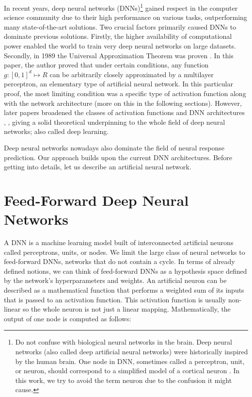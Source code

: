 In recent years, deep neural networks (DNNs)\footnote{Do not confuse with biological neural networks in the brain. Deep neural networks (also called deep artificial neural networks) were historically inspired by the human brain. One node in DNN, sometimes called a perceptron, unit, or neuron, should correspond to a simplified model of a cortical neuron \citep{rosenblatt1958perceptron}. In this work, we try to avoid the term neuron due to the confusion it might cause.} gained respect in the computer science community due to their high performance on various tasks, outperforming many state-of-the-art solutions. Two crucial factors primarily caused DNNs to dominate previous solutions. Firstly, the higher availability of computational power enabled the world to train very deep neural networks on large datasets. Secondly, in 1989 the Universal Approximation Theorem was proven \citep{cybenko1989approximation}. In this paper, the author proved that under certain conditions, any function $g: [0, 1]^d \mapsto R$ can be arbitrarily closely approximated by a multilayer perceptron, an elementary type of artificial neural network. In this particular proof, the most limiting condition was a specific type of activation function along with the network architecture (more on this in the following sections). However, later papers broadened the classes of activation functions and DNN architectures \citep{leshno1993multilayer}, \citep{heinecke2020refinement} \citep{zhou2020universality}, giving a solid theoretical underpinning to the whole field of deep neural networks; also called deep learning.

Deep neural networks nowadays also dominate the field of neural response prediction. Our approach builds upon the current DNN architectures. Before getting into details, let us describe an artificial neural network.

\section{Feed-Forward Deep Neural Networks}

A DNN is a machine learning model built of interconnected artificial neurons called perceptrons, units, or nodes. We limit the large class of neural networks to feed-forward DNNs, networks that do not contain a cycle. In terms of already defined notions, we can think of feed-forward DNNs as a hypothesis space defined by the network’s hyperparameters and weights. An artificial neuron can be described as a mathematical function that performs a weighted sum of its inputs that is passed to an activation function. This activation function is usually non-linear so the whole neuron is not just a linear mapping. Mathematically, the output of one node is computed as follows: 

